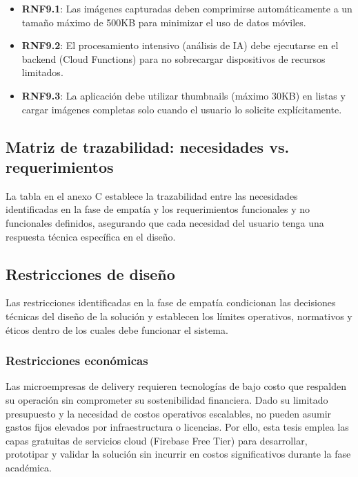\begin{itemize}
    \item \textbf{RNF9.1}: Las imágenes capturadas deben comprimirse automáticamente a un tamaño máximo de 500KB para minimizar el uso de datos móviles.
    
    \item \textbf{RNF9.2}: El procesamiento intensivo (análisis de IA) debe ejecutarse en el backend (Cloud Functions) para no sobrecargar dispositivos de recursos limitados.
    
    \item \textbf{RNF9.3}: La aplicación debe utilizar thumbnails (máximo 30KB) en listas y cargar imágenes completas solo cuando el usuario lo solicite explícitamente.
\end{itemize}

\subsection{Matriz de trazabilidad: necesidades vs. requerimientos}

La tabla en el anexo C establece la trazabilidad entre las necesidades identificadas en la fase de empatía y los requerimientos funcionales y no funcionales definidos, asegurando que cada necesidad del usuario tenga una respuesta técnica específica en el diseño.

\subsection{Restricciones de diseño}

Las restricciones identificadas en la fase de empatía condicionan las decisiones técnicas del diseño de la solución y establecen los límites operativos, normativos y éticos dentro de los cuales debe funcionar el sistema.

\subsubsection{Restricciones económicas}

Las microempresas de delivery requieren tecnologías de bajo costo que respalden su operación sin comprometer su sostenibilidad financiera. Dado su limitado presupuesto y la necesidad de costos operativos escalables, no pueden asumir gastos fijos elevados por infraestructura o licencias. Por ello, esta tesis emplea las capas gratuitas de servicios cloud (Firebase Free Tier) para desarrollar, prototipar y validar la solución sin incurrir en costos significativos durante la fase académica.

